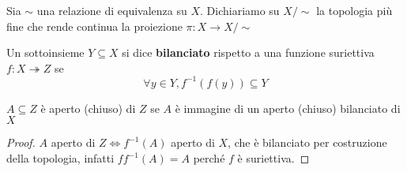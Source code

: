 \begin{definition}
    Sia \(\sim\) una relazione di equivalenza su \(X\). Dichiariamo su \(X/\sim\)
    la topologia più fine che rende continua la proiezione \(\pi: X \to X/\sim\)
\end{definition}

\begin{definition}
    Un sottoinsieme \(Y \subseteq X \) si dice \textbf{bilanciato} rispetto a una
    funzione suriettiva \(f : X \twoheadrightarrow Z\) se
    \[
        \forall y \in Y, f^{-1}(f(y)) \subseteq Y 
    \]
\end{definition}
\begin{proposition}
    \(A \subseteq Z \) è aperto (chiuso) di \(Z\) se \(A\) è immagine di un
    aperto (chiuso) bilanciato di \(X\) 
\end{proposition}
\begin{proof}
    \(A\) aperto di \(Z \iff f^{-1}(A)\) aperto di \(X\), che è bilanciato per
    costruzione della topologia, infatti \(ff^{-1}(A) = A\) perché \(f\) è
    suriettiva.
\end{proof}

